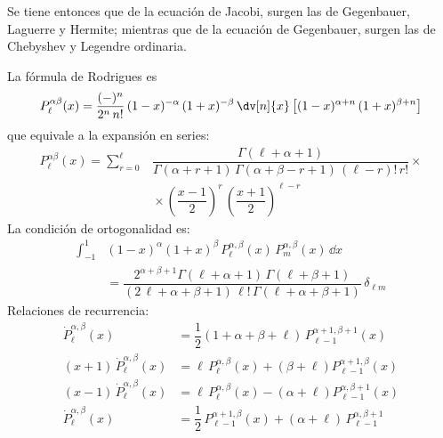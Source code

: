 Se tiene entonces que de la ecuación de Jacobi, surgen las de Gegenbauer, Laguerre y Hermite; mientras que de la ecuación de Gegenbauer, surgen las de Chebyshev y Legendre ordinaria.
\par
La fórmula de Rodrigues es
\[ P_{\ell}^{\alpha \beta} (x) = \dfrac{(-)^{n}}{2^{n} \, n!} \, (1 - x)^{-\alpha} \, (1 + x)^{- \beta} \, \dv[n]{x} \left[ (1 -x)^{\alpha+n} \, (1+ x)^{\beta+n}  \right] \]
que equivale a la expansión en series:
\begin{align*}
P_{\ell}^{\alpha \beta} (x) = \sum_{r=0}^{\ell} &\dfrac{\Gamma (\ell + \alpha + 1)}{\Gamma (\alpha + r + 1) \, \Gamma (\alpha + \beta - r + 1) \, (\ell -r)! \, r!} \times \\
&{} \times \left( \dfrac{x - 1}{2} \right)^{r} \, \left( \dfrac{x+1}{2} \right)^{\ell-r}
\end{align*}
La condición de ortogonalidad es:
\begin{align*}
\int_{-1}^{1} &(1 - x)^{\alpha} (1 + x)^{\beta} \, P_{\ell}^{\alpha, \beta} (x) \, P_{m}^{\alpha, \beta} (x) \, \dd{x} \\
&= \dfrac{2^{\alpha+\beta+1} \Gamma (\ell + \alpha + 1) \, \Gamma (\ell + \beta + 1)}{(2 \, \ell + \alpha +\beta + 1) \, \ell! \, \Gamma (\ell + \alpha + \beta + 1)} \, \delta_{\ell  m}
\end{align*}
Relaciones de recurrencia:
\begin{align*}
\dot{P}_{\ell}^{\alpha, \beta} (x) &= \dfrac{1}{2} (1 + \alpha + \beta + \ell) \, P_{\ell-1}^{\alpha+1, \beta+1}(x) \\[1em]
(x + 1) \, \dot{P}_{\ell}^{\alpha, \beta} (x) &= \ell \, P_{\ell}^{\alpha, \beta} (x) + (\beta + \ell) P_{\ell-1}^{\alpha+1, \beta} (x) \\[1em]
(x - 1) \, \dot{P}_{\ell}^{\alpha, \beta} (x) &= \ell \, P_{\ell}^{\alpha, \beta} (x) - (\alpha + \ell) P_{\ell-1}^{\alpha, \beta+1} (x) \\[1em]
\dot{P}_{\ell}^{\alpha, \beta} (x) &= \dfrac{1}{2} \, P_{\ell-1}^{\alpha+1, \beta}(x) + (\alpha + \ell) \, P_{\ell-1}^{\alpha, \beta+1}
\end{align*}
